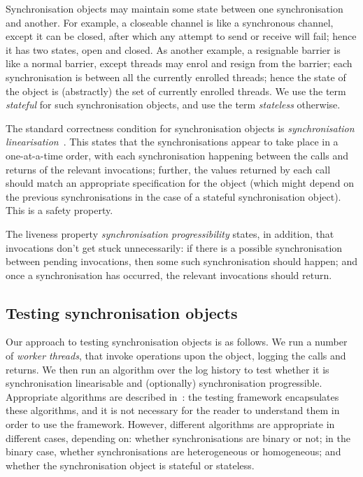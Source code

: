 Synchronisation objects may maintain some state between one synchronisation
and another.  For example, a closeable channel is like a synchronous channel,
except it can be closed, after which any attempt to send or receive will fail;
hence it has two states, open and closed.  As another example, a resignable
barrier is like a normal barrier, except threads may enrol and resign from the
barrier; each synchronisation is between all the currently enrolled threads;
hence the state of the object is (abstractly) the set of currently enrolled
threads.  We use the term \emph{stateful} for such synchronisation objects,
and use the term \emph{stateless} otherwise. 

The standard correctness condition for synchronisation objects is
\emph{synchronisation linearisation}~\cite{sync}.  This states that the
synchronisations appear to take place in a one-at-a-time order, with each
synchronisation happening between the calls and returns of the relevant
invocations; further, the values returned by each call should match an
appropriate specification for the object (which might depend on the previous
synchronisations in the case of a stateful synchronisation object).  This is a
safety property.

The liveness property \emph{synchronisation progressibility} states, in
addition, that invocations don't get stuck unnecessarily: if there is a
possible synchronisation between pending invocations, then some such
synchronisation should happen; and once a synchronisation has occurred, the
relevant invocations should return.


\subsection{Testing synchronisation objects}

Our approach to testing synchronisation objects is as follows.  We run a
number of \emph{worker threads}, that invoke operations upon the object,
logging the calls and returns.  We then run an algorithm over the log history
to test whether it is synchronisation linearisable and (optionally)
synchronisation progressible.  Appropriate algorithms are described
in~\cite{sync}: the testing framework encapsulates these algorithms, and it is
not necessary for the reader to understand them in order to use the framework.
However, different algorithms are appropriate in different cases, depending
on: whether synchronisations are binary or not; in the binary case, whether
synchronisations are heterogeneous or homogeneous; and whether the
synchronisation object is stateful or stateless.

